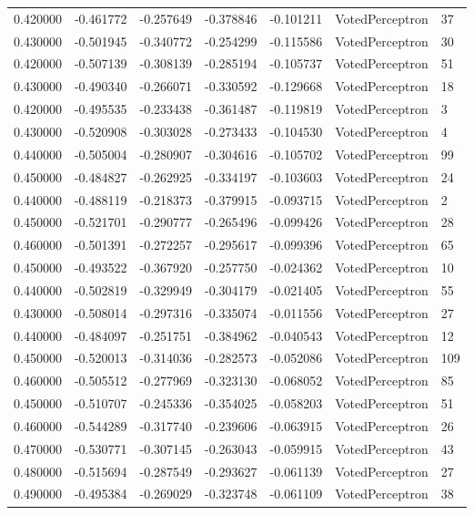 \begin{tabular}{rrrrrll}
0.420000 & -0.461772 & -0.257649 & -0.378846 & -0.101211 & VotedPerceptron & 37 \\
0.430000 & -0.501945 & -0.340772 & -0.254299 & -0.115586 & VotedPerceptron & 30 \\
0.420000 & -0.507139 & -0.308139 & -0.285194 & -0.105737 & VotedPerceptron & 51 \\
0.430000 & -0.490340 & -0.266071 & -0.330592 & -0.129668 & VotedPerceptron & 18 \\
0.420000 & -0.495535 & -0.233438 & -0.361487 & -0.119819 & VotedPerceptron & 3 \\
0.430000 & -0.520908 & -0.303028 & -0.273433 & -0.104530 & VotedPerceptron & 4 \\
0.440000 & -0.505004 & -0.280907 & -0.304616 & -0.105702 & VotedPerceptron & 99 \\
0.450000 & -0.484827 & -0.262925 & -0.334197 & -0.103603 & VotedPerceptron & 24 \\
0.440000 & -0.488119 & -0.218373 & -0.379915 & -0.093715 & VotedPerceptron & 2 \\
0.450000 & -0.521701 & -0.290777 & -0.265496 & -0.099426 & VotedPerceptron & 28 \\
0.460000 & -0.501391 & -0.272257 & -0.295617 & -0.099396 & VotedPerceptron & 65 \\
0.450000 & -0.493522 & -0.367920 & -0.257750 & -0.024362 & VotedPerceptron & 10 \\
0.440000 & -0.502819 & -0.329949 & -0.304179 & -0.021405 & VotedPerceptron & 55 \\
0.430000 & -0.508014 & -0.297316 & -0.335074 & -0.011556 & VotedPerceptron & 27 \\
0.440000 & -0.484097 & -0.251751 & -0.384962 & -0.040543 & VotedPerceptron & 12 \\
0.450000 & -0.520013 & -0.314036 & -0.282573 & -0.052086 & VotedPerceptron & 109 \\
0.460000 & -0.505512 & -0.277969 & -0.323130 & -0.068052 & VotedPerceptron & 85 \\
0.450000 & -0.510707 & -0.245336 & -0.354025 & -0.058203 & VotedPerceptron & 51 \\
0.460000 & -0.544289 & -0.317740 & -0.239606 & -0.063915 & VotedPerceptron & 26 \\
0.470000 & -0.530771 & -0.307145 & -0.263043 & -0.059915 & VotedPerceptron & 43 \\
0.480000 & -0.515694 & -0.287549 & -0.293627 & -0.061139 & VotedPerceptron & 27 \\
0.490000 & -0.495384 & -0.269029 & -0.323748 & -0.061109 & VotedPerceptron & 38 \\

\end{tabular}
